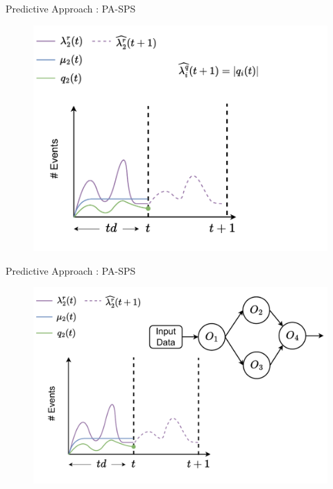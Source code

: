\begin{frame}{Predictive Approach : PA-SPS}
\begin{figure}
    \centering
    \includegraphics[scale=0.63]{images/concepts/predictive/PA-SPS-Prediction-10-2.pdf}
\end{figure}
\end{frame}

\begin{frame}{Predictive Approach : PA-SPS}
\begin{figure}
    \centering
    \includegraphics[scale=0.63]{images/concepts/predictive/PA-SPS-Prediction-11.pdf}
\end{figure}
\end{frame}

